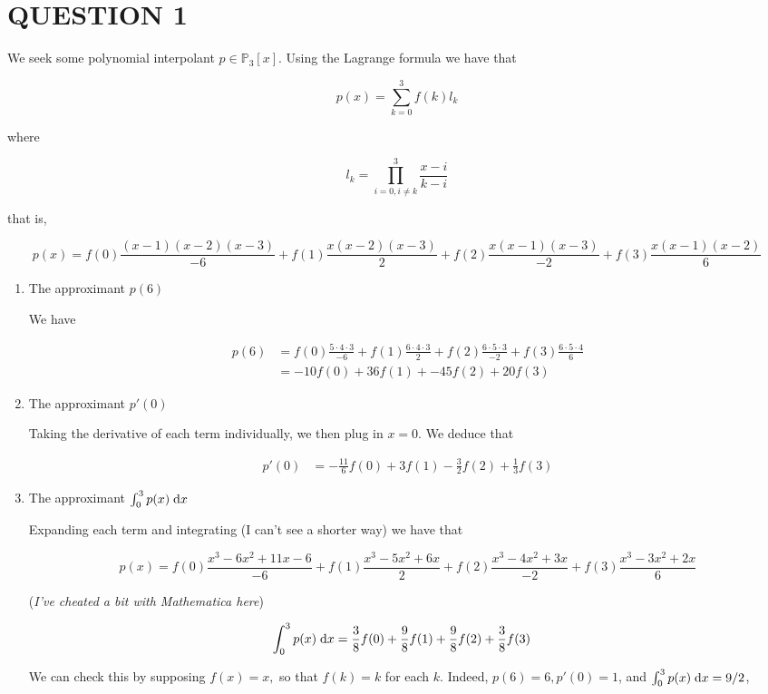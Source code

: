 \documentclass[a4paper]{article}
\begin{document}
	
\maketitle

\section{QUESTION 1}

We seek some polynomial interpolant $ p \in \mathbb{P}_{3}[x] $. Using the Lagrange formula we have that

\[ p(x) = \sum_{k=0}^{3} f(k) l_{k}  \]

where 

\[ l_{k} = \prod_{i=0, i \neq k}^{3} \frac{x - i}{k - i}  \] 

that is,

\[ p(x) = f(0) \frac{(x-1)(x-2)(x-3)}{-6} + f(1) \frac{x(x-2)(x-3)}{2} + f(2) \frac{x(x-1)(x-3)}{-2} + f(3) \frac{x(x-1)(x-2)}{6}  \]

\begin{enumerate}
	\item The approximant $ p(6) $
	
	We have
	
	\begin{align*}
	p(6) & = f(0) \frac{5 \cdot 4 \cdot 3}{-6} + f(1) \frac{6\cdot 4 \cdot 3}{2} + f(2) \frac{6 \cdot 5 \cdot 3}{-2} + f(3) \frac{6 \cdot 5 \cdot 4}{6} \\
	& = -10 f(0) + 36 f(1)+ -45 f(2) + 20 f(3) 
	\end{align*}
	
	\item The approximant $ p'(0) $
	
	Taking the derivative of each term individually, we then plug in $ x=0 $. We deduce that
	
	\begin{align*}
	p'(0) & = -\frac{11}{6} f(0) + 3f(1) - \frac{3}{2}  f(2) + \frac{1}{3} f(3) 
	\end{align*}
	
	\item The approximant $ \int_{0}^{3} p(x) \; \mathrm{d} x $
	
	Expanding each term and integrating (I can't see a shorter way) we have that

	\[ p(x) = f(0) \frac{x^{3} - 6x^{2} + 11 x - 6}{-6} + f(1) \frac{x^{3}  - 5 x^{2} + 6x}{2} + f(2) \frac{x^{3} - 4 x^{2} + 3x}{-2} + f(3) \frac{x^{3} - 3x^{2} + 2x}{6}  \]
	
	(\emph{I've cheated a bit with Mathematica here})
	
	\begin{align*}
	\int_{0}^{3} p(x) \; \mathrm{d} x & = \frac{3}{8} f(0) + \frac{9}{8} f(1) +  \frac{9}{8} f(2) + \frac{3}{8} f(3)  
	\end{align*}
	
	We can check this by supposing $ f(x) = x, $ so that $ f(k)  = k  $ for each $ k $. Indeed, $ p(6) = 6, p'(0) = 1 $, and $ \int_{0}^{3} p(x) \; \mathrm{d} x =  9/2 $, 
	
\end{enumerate}
\end{document}
